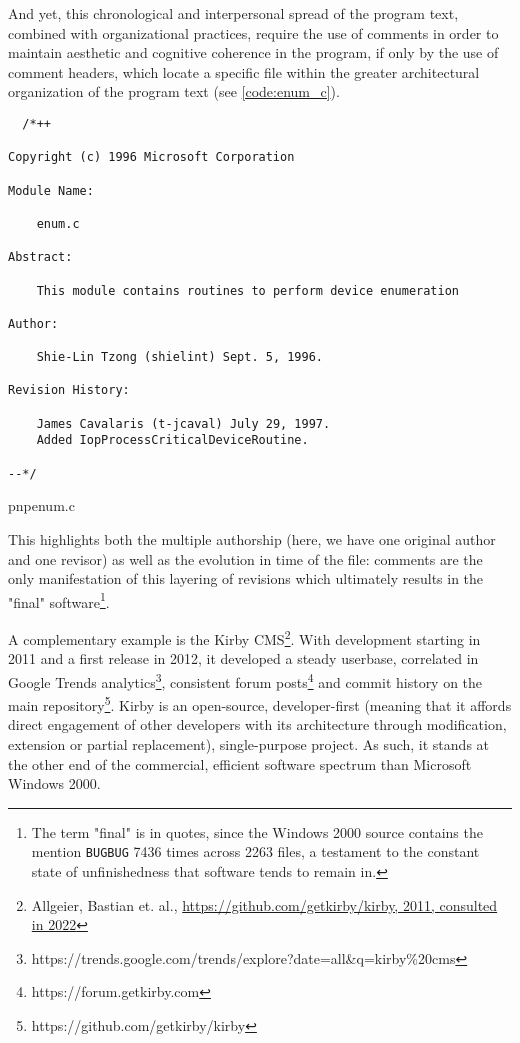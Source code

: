 And yet, this chronological and interpersonal spread of the program text, combined with organizational practices, require the use of comments in order to maintain aesthetic and cognitive coherence in the program, if only by the use of comment headers, which locate a specific file within the greater architectural organization of the program text (see \ref{code:enum_c}).

\begin{listing}
  \begin{verbatim}
  /*++

Copyright (c) 1996 Microsoft Corporation

Module Name:

    enum.c

Abstract:

    This module contains routines to perform device enumeration

Author:

    Shie-Lin Tzong (shielint) Sept. 5, 1996.

Revision History:

    James Cavalaris (t-jcaval) July 29, 1997.
    Added IopProcessCriticalDeviceRoutine.

--*/
\end{verbatim}
  \caption{pnpenum.c}
  \label{code:enum_c}
\end{listing}


This highlights both the multiple authorship (here, we have one original author and one revisor) as well as the evolution in time of the file: comments are the only manifestation of this layering of revisions which ultimately results in the "final" software\footnote{The term "final" is in quotes, since the Windows 2000 source contains the mention \lstinline{BUGBUG} 7436 times across 2263 files, a testament to the constant state of unfinishedness that software tends to remain in.}.

A complementary example is the Kirby CMS\footnote{Allgeier, Bastian et. al., \url{https://github.com/getkirby/kirby, 2011, consulted in 2022}}. With development starting in 2011 and a first release in 2012, it developed a steady userbase, correlated in Google Trends analytics\footnote{https://trends.google.com/trends/explore?date=all\&q=kirby\%20cms}, consistent forum posts\footnote{https://forum.getkirby.com} and commit history on the main repository\footnote{https://github.com/getkirby/kirby}. Kirby is an open-source, developer-first (meaning that it affords direct engagement of other developers with its architecture through modification, extension or partial replacement), single-purpose project. As such, it stands at the other end of the commercial, efficient software spectrum than Microsoft Windows 2000.

